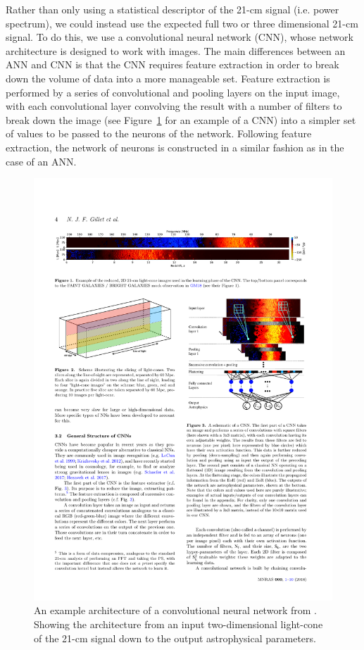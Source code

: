 Rather than only using a statistical descriptor of the 21-cm signal (i.e. power spectrum), we could instead use the expected full two or three dimensional 21-cm signal. To do this, we use a convolutional neural network (CNN), whose network architecture is designed to work with images. The main differences between an ANN and CNN is that the CNN requires feature extraction in order to break down the volume of data into a more manageable set. Feature extraction is performed by a series of convolutional and pooling layers on the input image, with each convolutional layer convolving the result with a number of filters to break down the image (see Figure~\ref{fig:CNN} for an example of a CNN) into a simpler set of values to be passed to the neurons of the network. Following feature extraction, the network of neurons is constructed in a similar fashion as in the case of an ANN.

\begin{figure}[]
\begin{center}
\includegraphics[trim = 0.2cm 1cm 0.2cm 0.2cm, scale = 1.05]{Greig/CNNexample}
\end{center}
\caption{An example architecture of a convolutional neural network from \cite{Gillet:2019}. Showing the architecture from an input two-dimensional light-cone of the 21-cm signal down to the output astrophysical parameters.}
\label{fig:CNN}
\end{figure}

